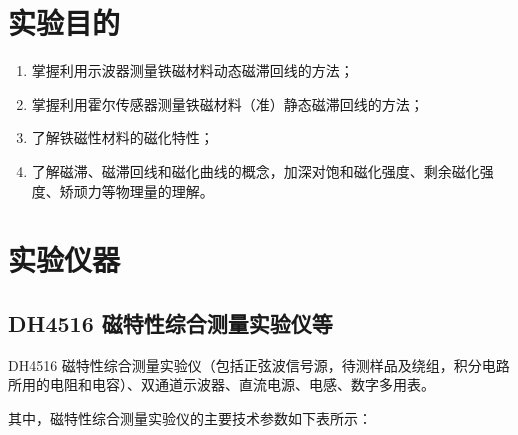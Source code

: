 \documentclass[UTF8]{article}
\theoremstyle{MyLineTheoremStyle} %
\theoremstyle{MyBlockTheoremStyle} %
\theoremstyle{MySubsubsectionStyle} %
\begin{document}

\newpage
{}






\section{实验目的}

\begin{enumerate}
\item 掌握利用示波器测量铁磁材料动态磁滞回线的方法；
\item 掌握利用霍尔传感器测量铁磁材料（准）静态磁滞回线的方法；
\item 了解铁磁性材料的磁化特性；
\item 了解磁滞、磁滞回线和磁化曲线的概念，加深对饱和磁化强度、剩余磁化强度、矫顽力等物理量的理解。
\end{enumerate}


\section{实验仪器}

\subsection{DH4516 磁特性综合测量实验仪等}

DH4516 磁特性综合测量实验仪（包括正弦波信号源，待测样品及绕组，积分电路所用的电阻和电容）、双通道示波器、直流电源、电感、数字多用表。

其中，磁特性综合测量实验仪的主要技术参数如下表所示：
\end{document}
